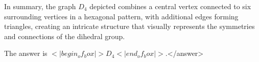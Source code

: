 In summary, the graph \( D_4 \) depicted combines a central vertex connected to six surrounding vertices in a hexagonal pattern, with additional edges forming triangles, creating an intricate structure that visually represents the symmetries and connections of the dihedral group.  

The answer is \(<|begin_of_box|>D_4<|end_of_box|>\).</answer>